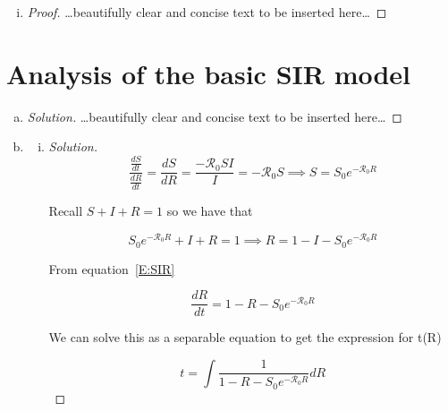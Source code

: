 \documentclass[12pt]{article}
\begin{document}
\begin{enumerate}[(a)]
\begin{enumerate}[(i)]
  \item \SIanalQbii
    
    {\color{blue}
      \begin{proof}
        {\color{magenta}\dots beautifully clear and concise text to be inserted here\dots}
      \end{proof}
    }
    
  \end{enumerate}
\end{enumerate}

\section{Analysis of the basic SIR model}

\basicSIRanalIntro
\begin{enumerate}[(a)]
\item \basicSIRanalQa

{\color{blue}
\begin{proof}[Solution]
{\color{magenta}\dots beautifully clear and concise text to be inserted here\dots}
\end{proof}
}

\item \basicSIRanalQb
  \begin{enumerate}[(i)]
  \item \basicSIRanalQbi

{\color{blue}
\begin{proof}[Solution]

	\begin{equation}
	\frac{\frac{dS}{dt}}{\frac{dR}{dt}} = \frac{dS}{dR} = \frac{-\mathcal{R}_0SI}{I} = -\mathcal{R}_0S \implies S=S_0e^{-\mathcal{R}_0R}
	\end{equation}
	
	Recall $S+I+R=1$ so we have that
	
	\begin{equation}
	S_0e^{-\mathcal{R}_0R}+I+R = 1 \implies R=1-I-S_0e^{-\mathcal{R}_0R}
	\end{equation}
	
	From equation~\eqref{E:SIR}
	
	\begin{equation}
	\frac{dR}{dt}=1-R-S_0e^{-\mathcal{R}_0R}
	\end{equation}
	
	We can solve this as a separable equation to  get the expression for t(R)
	
	\begin{equation}
	t=\int \frac{1}{1-R-S_0e^{-\mathcal{R}_0R}}dR
	\end{equation}
	

\end{proof}}
\end{enumerate}
\end{enumerate}
\end{document}
